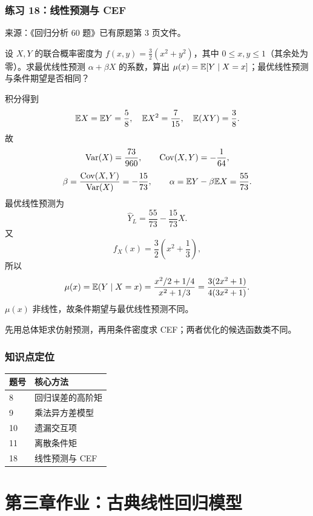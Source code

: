 \subsection*{练习 18：线性预测与 CEF}
\begin{homework}[练习 18]
\textsf{来源：《回归分析 60 题》已有原题第 3 页文件。}\par
设 $X,Y$ 的联合概率密度为 $f(x,y)=\frac32(x^2+y^2)$，其中 $0\leq x,y\leq1$（其余处为零）。求最优线性预测 $\alpha+\beta X$ 的系数，算出 $\mu(x)=\mathbb{E}[Y\mid X=x]$；最优线性预测与条件期望是否相同？
\end{homework}
\begin{solution}
积分得到
\[
\mathbb{E} X=\mathbb{E} Y=\frac58,\quad
\mathbb{E} X^2=\frac7{15},\quad
\mathbb{E}(XY)=\frac38.
\]
故
\[
\operatorname{Var}(X)=\frac{73}{960},\qquad
\operatorname{Cov}(X,Y)=-\frac1{64},
\]
\[
\beta=\frac{\operatorname{Cov}(X,Y)}{\operatorname{Var}(X)}=-\frac{15}{73},
\qquad
\alpha=\mathbb{E} Y-\beta\mathbb{E} X=\frac{55}{73}.
\]
最优线性预测为
\[
\widehat Y_L=\frac{55}{73}-\frac{15}{73}X.
\]
又
\[
f_X(x)=\frac32\left(x^2+\frac13\right),
\]
所以
\[
\mu(x)=\mathbb{E}(Y\mid X=x)
=\frac{x^2/2+1/4}{x^2+1/3}
=\frac{3(2x^2+1)}{4(3x^2+1)}.
\]
$\mu(x)$ 非线性，故条件期望与最优线性预测不同。
\end{solution}
\begin{dxtips}\label{hw:reg:tip:18}
先用总体矩求仿射预测，再用条件密度求 CEF；两者优化的候选函数类不同。
\end{dxtips}

\subsection*{知识点定位}\begin{center}\begin{tabular}{ll}\toprule 题号 & 核心方法\\\midrule

8 & 回归误差的高阶矩 \\

9 & 乘法异方差模型 \\

10 & 遗漏交互项 \\

11 & 离散条件矩 \\

18 & 线性预测与 CEF \\

\bottomrule\end{tabular}\end{center}
\endgroup
\begingroup
\chapter*{第三章作业：古典线性回归模型}
\setcounter{section}{0}
\renewcommand{\thesection}{\arabic{section}}
\renewcommand{\thechapter}{3}
\renewcommand{\theHsection}{reg.homework.3.\arabic{section}}

